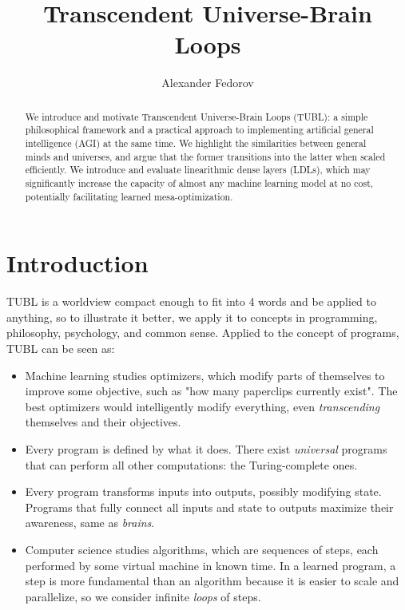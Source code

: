 \documentclass{article}
\begin{document}
\title{Transcendent Universe-Brain Loops}
\author{Alexander Fedorov}
\date{}

\maketitle

\begin{abstract}

We introduce and motivate Transcendent Universe-Brain Loops (TUBL): a simple philosophical framework and a practical approach to implementing artificial general intelligence (AGI) at the same time. We highlight the similarities between general minds and universes, and argue that the former transitions into the latter when scaled efficiently. We introduce and evaluate linearithmic dense layers (LDLs), which may significantly increase the capacity of almost any machine learning model at no cost, potentially facilitating learned mesa-optimization.

\end{abstract}

\section{Introduction}

TUBL is a worldview compact enough to fit into 4 words and be applied to anything, so to illustrate it better, we apply it to concepts in programming, philosophy, psychology, and common sense. Applied to the concept of programs, TUBL can be seen as:

\begin{itemize}
\item Machine learning studies optimizers, which modify parts of themselves to improve some objective, such as "how many paperclips currently exist". The best optimizers would intelligently modify everything, even \textit{transcending} themselves and their objectives.
\item Every program is defined by what it does. There exist \textit{universal} programs that can perform all other computations: the Turing-complete ones.
\item Every program transforms inputs into outputs, possibly modifying state. Programs that fully connect all inputs and state to outputs maximize their awareness, same as \textit{brains}.
\item Computer science studies algorithms, which are sequences of steps, each performed by some virtual machine in known time. In a learned program, a step is more fundamental than an algorithm because it is easier to scale and parallelize, so we consider infinite \textit{loops} of steps.
\end{itemize}
\end{document}
